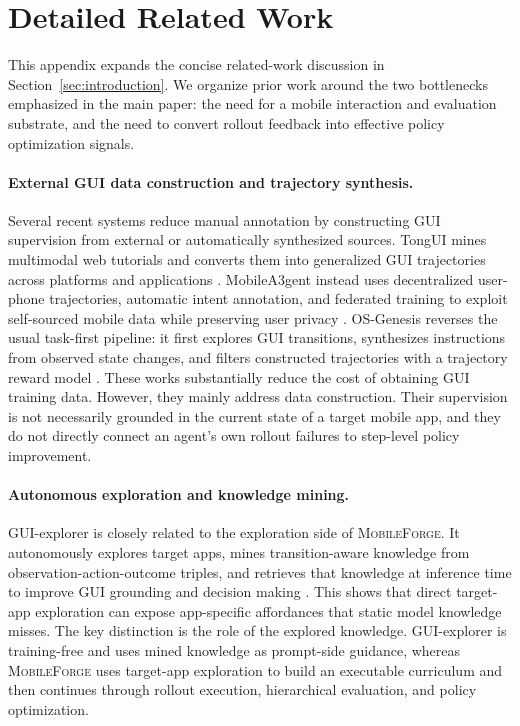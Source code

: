 \documentclass{llmxive}
\providecommand{\ourmethod}{\textsc{MobileForge}\xspace}
\begin{document}




\appendix
\section{Detailed Related Work}
\label{sec:related}

This appendix expands the concise related-work discussion in Section~\ref{sec:introduction}. We organize prior work around the two bottlenecks emphasized in the main paper: the need for a mobile interaction and evaluation substrate, and the need to convert rollout feedback into effective policy optimization signals.

\paragraph{External GUI data construction and trajectory synthesis.}
Several recent systems reduce manual annotation by constructing GUI supervision from external or automatically synthesized sources. TongUI mines multimodal web tutorials and converts them into generalized GUI trajectories across platforms and applications \citep{zhang2025tongui}. MobileA3gent instead uses decentralized user-phone trajectories, automatic intent annotation, and federated training to exploit self-sourced mobile data while preserving user privacy \citep{wang2025mobilea3gent}. OS-Genesis reverses the usual task-first pipeline: it first explores GUI transitions, synthesizes instructions from observed state changes, and filters constructed trajectories with a trajectory reward model \citep{sun2025genesis}. These works substantially reduce the cost of obtaining GUI training data. However, they mainly address data construction. Their supervision is not necessarily grounded in the current state of a target mobile app, and they do not directly connect an agent's own rollout failures to step-level policy improvement.

\paragraph{Autonomous exploration and knowledge mining.}
GUI-explorer is closely related to the exploration side of \ourmethod. It autonomously explores target apps, mines transition-aware knowledge from observation-action-outcome triples, and retrieves that knowledge at inference time to improve GUI grounding and decision making \citep{xie2025gui}. This shows that direct target-app exploration can expose app-specific affordances that static model knowledge misses. The key distinction is the role of the explored knowledge. GUI-explorer is training-free and uses mined knowledge as prompt-side guidance, whereas \ourmethod uses target-app exploration to build an executable curriculum and then continues through rollout execution, hierarchical evaluation, and policy optimization.
\end{document}
